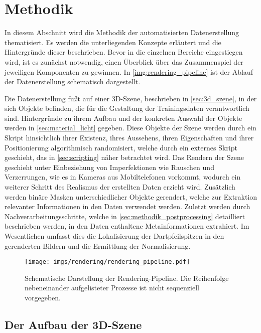 
\section{Methodik}
\label{sec:daten:methodik}

In diesem Abschnitt wird die Methodik der automatisierten Datenerstellung thematisiert. Es werden die unterliegenden Konzepte erläutert und die Hintergründe dieser beschrieben. Bevor in die einzelnen Bereiche eingestiegen wird, ist es zunächst notwendig, einen Überblick über das Zusammenspiel der jeweiligen Komponenten zu gewinnen. In \autoref{img:rendering_pipeline} ist der Ablauf der Datenerstellung schematisch dargestellt.

Die Datenerstellung fußt auf einer 3D-Szene, beschrieben in \autoref{sec:3d_szene}, in der sich Objekte befinden, die für die Gestaltung der Trainingsdaten verantwortlich sind. Hintergründe zu ihrem Aufbau und der konkreten Auswahl der Objekte werden in \autoref{sec:material_licht} gegeben. Diese Objekte der Szene werden durch ein Skript hinsichtlich ihrer Existenz, ihres Aussehens, ihren Eigenschaften und ihrer Positionierung algorithmisch randomisiert, welche durch ein externes Skript geschieht, das in \autoref{sec:scripting} näher betrachtet wird. Das Rendern der Szene geschieht unter Einbeziehung von Imperfektionen wie Rauschen und Verzerrungen, wie es in Kameras aus Mobiltelefonen vorkommt, wodurch ein weiterer Schritt des Realismus der erstellten Daten erzieht wird. Zusätzlich werden binäre Masken unterschiedlicher Objekte gerendert, welche zur Extraktion relevanter Informationen in den Daten verwendet werden. Zuletzt werden durch Nachverarbeitungsschritte, welche in \autoref{sec:methodik_postprocessing} detailliert beschrieben werden, in den Daten enthaltene Metainformationen extrahiert. Im Wesentlichen umfasst dies die Lokalisierung der Dartpfeilspitzen in den gerenderten Bildern und die Ermittlung der Normalisierung.

\begin{figure}
    \centering
    \texttt{[image: imgs/rendering/rendering\_pipeline.pdf]}
    \caption{Schematische Darstellung der Rendering-Pipeline. Die Reihenfolge nebeneinander aufgelisteter Prozesse ist nicht sequenziell vorgegeben.}
    \label{img:rendering_pipeline}
\end{figure}

\subsection{Der Aufbau der 3D-Szene} %
\label{sec:3d_szene}

